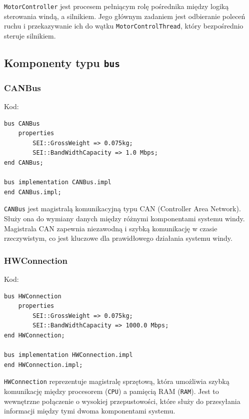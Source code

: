 \documentclass{article}
\begin{document}
    \texttt{MotorController} jest procesem pełniącym rolę pośrednika między logiką sterowania windą, a silnikiem. Jego głównym zadaniem jest odbieranie poleceń ruchu i przekazywanie ich do wątku \texttt{MotorControlThread}, który bezpośrednio steruje silnikiem.










    \subsection{Komponenty typu \texttt{bus}}

    
    \subsubsection{CANBus}

    Kod:
    
    \begin{lstlisting}[basicstyle=\ttfamily, keywordstyle=\bfseries]
bus CANBus
    properties
        SEI::GrossWeight => 0.075kg;
        SEI::BandWidthCapacity => 1.0 Mbps; 
end CANBus;

bus implementation CANBus.impl
end CANBus.impl;
    \end{lstlisting}

    \texttt{CANBus} jest magistralą komunikacyjną typu CAN (Controller Area Network). Służy ona do wymiany danych między różnymi komponentami systemu windy. Magistrala CAN zapewnia niezawodną i szybką komunikację w czasie rzeczywistym, co jest kluczowe dla prawidłowego działania systemu windy.


    \subsubsection{HWConnection}

    Kod:
    
    \begin{lstlisting}[basicstyle=\ttfamily, keywordstyle=\bfseries]
bus HWConnection
    properties
        SEI::GrossWeight => 0.075kg;
        SEI::BandWidthCapacity => 1000.0 Mbps;
end HWConnection;

bus implementation HWConnection.impl
end HWConnection.impl;
    \end{lstlisting}

    \texttt{HWConnection} reprezentuje magistralę sprzętową, która umożliwia szybką komunikację między procesorem (\texttt{CPU}) a pamięcią RAM (\texttt{RAM}). Jest to wewnętrzne połączenie o wysokiej przepustowości, które służy do przesyłania informacji między tymi dwoma komponentami systemu.
\end{document}
